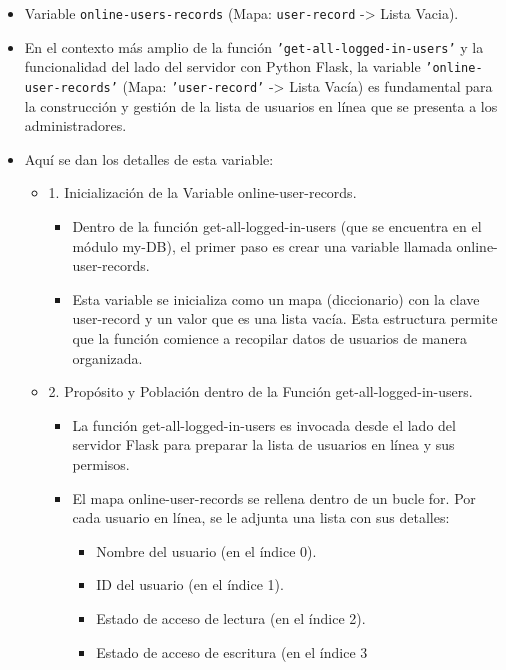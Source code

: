 \documentclass{report}
\begin{document}
\begin{itemize}
    \item Variable \texttt{online-users-records} (Mapa: \texttt{user-record} -> Lista Vacia).
    \item En el contexto más amplio de la función \texttt{'get-all-logged-in-users'} y la funcionalidad del lado del servidor con Python Flask, 
    la variable \texttt{'online-user-records'} (Mapa: \texttt{'user-record'} -> Lista Vacía) es fundamental para la construcción y gestión de la 
    lista de usuarios en línea que se presenta a los administradores.

    \item Aquí se dan los detalles de esta variable:
    \begin{itemize}
        \item 1. Inicialización de la Variable online-user-records.
            \begin{itemize}
                \item Dentro de la función get-all-logged-in-users (que se encuentra en el módulo my-DB), el primer paso es crear una variable llamada 
                online-user-records.
                \item Esta variable se inicializa como un mapa (diccionario) con la clave user-record y un valor que es una lista vacía. Esta estructura 
                permite que la función comience a recopilar datos de usuarios de manera organizada.
            \end{itemize}
        \item 2. Propósito y Población dentro de la Función get-all-logged-in-users.
            \begin{itemize}
                \item La función get-all-logged-in-users es invocada desde el lado del servidor Flask para preparar la lista de usuarios en línea y sus 
                permisos.
                \item El mapa online-user-records se rellena dentro de un bucle for. Por cada usuario en línea, se le adjunta una lista con sus 
                detalles:
                    \begin{itemize}
                        \item Nombre del usuario (en el índice 0).
                        \item ID del usuario (en el índice 1).
                        \item Estado de acceso de lectura (en el índice 2).
                        \item Estado de acceso de escritura (en el índice 3

\end{itemize}
\end{itemize}
\end{itemize}
\end{itemize}
\end{document}
